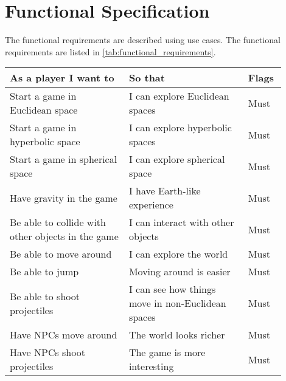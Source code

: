 \chapter{Functional Specification}\label{ch:functional_specification}
The functional requirements are described using use cases.
The functional requirements are listed in \autoref{tab:functional_requirements}.

\begin{table}[h]
    \begin{tabular}{|p{0.4\linewidth}|p{0.4\linewidth}|p{0.1\linewidth}|}
        \hline
        \textbf{As a player I want to}                             & \textbf{So that}                                                   & \textbf{Flags} \\ 
        \hline
        Start a game in Euclidean space                            & I can explore Euclidean spaces                                     & Must           \\
        Start a game in hyperbolic space                           & I can explore hyperbolic spaces                                    & Must           \\
        Start a game in spherical space                            & I can explore spherical space                                      & Must           \\
        Have gravity in the game                                   & I have Earth-like experience                                       & Must           \\
        Be able to collide with other objects in the game          & I can interact with other objects                                  & Must           \\
        Be able to move around                                     & I can explore the world                                            & Must           \\
        Be able to jump                                            & Moving around is easier                                            & Must           \\
        Be able to shoot projectiles                               & I can see how things move in non-Euclidean spaces                  & Must           \\
        Have NPCs move around                                      & The world looks richer                                             & Must           \\
        Have NPCs shoot projectiles                                & The game is more interesting                                       & Must           \\

\end{tabular}
\end{table}
